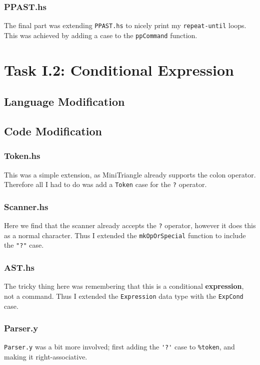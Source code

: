 \documentclass[12pt]{article}
\newcommand{\lstin}[3]{%
  
}
\begin{document}
\lstin{130}{131}{Parser.y}

\subsubsection{PPAST.hs}
The final part was extending \verb|PPAST.hs| to nicely print my \verb|repeat-until| loops.
This was achieved by adding a case to the \verb|ppCommand| function.

\lstin{70}{73}{PPAST.hs}

\section{Task I.2: Conditional Expression}
\subsection{Language Modification}

\subsection{Code Modification}
\subsubsection{Token.hs}
This was a simple extension, as MiniTriangle already supports the colon operator. 
Therefore all I had to do was add a \verb|Token| case for the \verb|?| operator.

\lstin{33}{33}{Token.hs}

\subsubsection{Scanner.hs}
Here we find that the scanner already accepts the \verb|?| operator, however it does this as a normal character. 
Thus I extended the \verb|mkOpOrSpecial| function to include the \verb|"?"| case.

\lstin{132}{132}{Scanner.hs}

\subsubsection{AST.hs}
The tricky thing here was remembering that this is a conditional \textbf{expression}, not a command. 
Thus I extended the \verb|Expression| data type with the \verb|ExpCond| case.

\lstin{162}{167}{AST.hs}

\subsubsection{Parser.y}
\verb|Parser.y| was a bit more involved; first adding the \verb|'?'| case to \verb|%token|, and making it right-associative.
\end{document}
